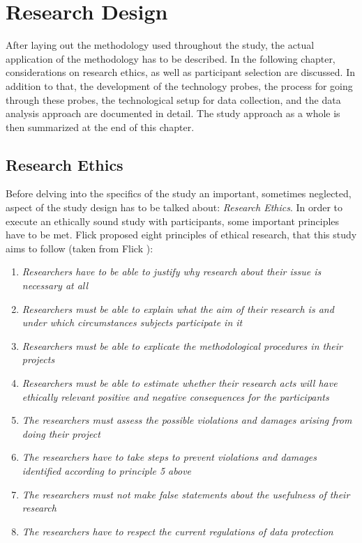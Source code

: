 \section{Research Design}

After laying out the methodology used throughout the study, the actual application of the methodology has to be described. In the following chapter, considerations on research ethics, as well as participant selection are discussed. In addition to that, the development of the technology probes, the process for going through these probes, the technological setup for data collection, and the data analysis approach are documented in detail. The study approach as a whole is then summarized at the end of this chapter.

\subsection{Research Ethics}

Before delving into the specifics of the study an important, sometimes neglected, aspect of the study design has to be talked about: \textit{Research Ethics}. In order to execute an ethically sound study with participants, some important principles have to be met. Flick proposed eight principles of ethical research, that this study aims to follow (taken from Flick \cite[p. 135]{flick2018introduction}):

\small{
  \begin{enumerate}
    \item{\textit{Researchers have to be able to justify why research about their issue is necessary at all}}
    \item{\textit{Researchers must be able to explain what the aim of their research is and under which circumstances subjects participate in it}}
    \item{\textit{Researchers must be able to explicate the methodological procedures in their projects}}
    \item{\textit{Researchers must be able to estimate whether their research acts will have ethically relevant positive and negative consequences for the participants}}
    \item{\textit{The researchers must assess the possible violations and damages arising from doing their project}}
    \item{\textit{The researchers have to take steps to prevent violations and damages identified according to principle 5 above}}
    \item{\textit{The researchers must not make false statements about the usefulness of their research}}
    \item{\textit{The researchers have to respect the current regulations of data protection}}
  \end{enumerate}
}

